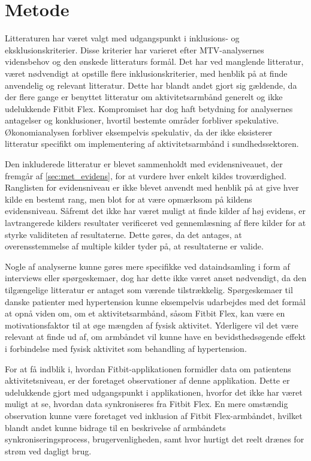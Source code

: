 \section{Metode}
Litteraturen har været valgt med udgangspunkt i inklusions- og eksklusionskriterier. Disse kriterier har varieret efter MTV-analysernes vidensbehov og den ønskede litteraturs formål. Det har ved manglende litteratur, været nødvendigt at opstille flere inklusionskriterier, med henblik på at finde anvendelig og relevant litteratur. Dette har blandt andet gjort sig gældende, da der flere gange er benyttet litteratur om aktivitetsarmbånd generelt og ikke udelukkende Fitbit Flex. Kompromiset har dog haft betydning for analysernes antagelser og konklusioner, hvortil bestemte områder forbliver spekulative. Økonomianalysen forbliver eksempelvis spekulativ, da der ikke eksisterer litteratur specifikt om implementering af aktivitetsarmbånd i sundhedssektoren. 

Den inkluderede litteratur er blevet sammenholdt med evidensniveauet, der fremgår af \autoref{sec:met_evidens}, for at vurdere hver enkelt kildes troværdighed. Ranglisten for evidensniveau er ikke blevet anvendt med henblik på at give hver kilde en bestemt rang, men blot for at være opmærksom på kildens evidensniveau. Såfremt det ikke har været muligt at finde kilder af høj evidens, er lavtrangerede kilders resultater verificeret ved gennemlæsning af flere kilder for at styrke validiteten af resultaterne.  Dette gøres, da det antages, at overensstemmelse af multiple kilder tyder på, at resultaterne er valide. 

Nogle af analyserne kunne gøres mere specifikke ved dataindsamling i form af interviews eller spørgeskemaer, dog har dette ikke været anset nødvendigt, da den tilgængelige litteratur er antaget som værende tilstrækkelig. Spørgeskemaer til danske patienter med hypertension kunne eksempelvis udarbejdes med det formål at opnå viden om, om et aktivitetsarmbånd, såsom Fitbit Flex, kan være en motivationsfaktor til at øge mængden af fysisk aktivitet. Yderligere vil det være relevant at finde ud af, om armbåndet vil kunne have en bevidsthedsøgende effekt i forbindelse med fysisk aktivitet som behandling af hypertension. 

For at få indblik i, hvordan Fitbit-applikationen formidler data om patientens aktivitetsniveau, er der foretaget observationer af denne applikation. Dette er udelukkende gjort med udgangspunkt i applikationen, hvorfor det ikke  har været muligt at se, hvordan data synkroniseres fra Fitbit Flex. En mere omstændig observation kunne være foretaget ved inklusion af Fitbit Flex-armbåndet, hvilket blandt andet kunne bidrage til en beskrivelse af armbåndets synkroniseringsprocess, brugervenligheden, samt hvor hurtigt det reelt drænes for strøm ved dagligt brug.  